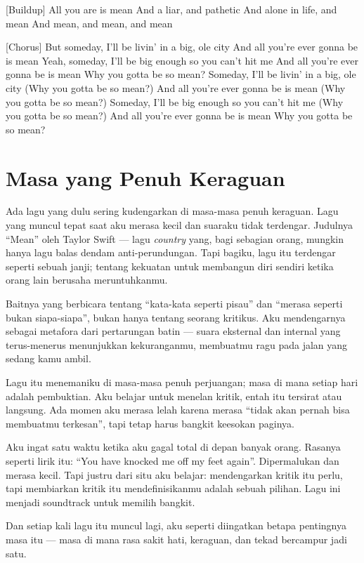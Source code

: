 \documentclass[
  letterpaper,
  DIV=11,
  numbers=noendperiod]{scrreprt}
\begin{document}
{[}Buildup{]} All you are is mean And a liar, and pathetic And alone in
life, and mean And mean, and mean, and mean

{[}Chorus{]} But someday, I'll be livin' in a big, ole city And all
you're ever gonna be is mean Yeah, someday, I'll be big enough so you
can't hit me And all you're ever gonna be is mean Why you gotta be so
mean? Someday, I'll be livin' in a big, ole city (Why you gotta be so
mean?) And all you're ever gonna be is mean (Why you gotta be so mean?)
Someday, I'll be big enough so you can't hit me (Why you gotta be so
mean?) And all you're ever gonna be is mean Why you gotta be so mean?

\section{Masa yang Penuh Keraguan}\label{masa-yang-penuh-keraguan}

Ada lagu yang dulu sering kudengarkan di masa-masa penuh keraguan. Lagu
yang muncul tepat saat aku merasa kecil dan suaraku tidak terdengar.
Judulnya ``Mean'' oleh Taylor Swift --- lagu \emph{country} yang, bagi
sebagian orang, mungkin hanya lagu balas dendam anti-perundungan. Tapi
bagiku, lagu itu terdengar seperti sebuah janji; tentang kekuatan untuk
membangun diri sendiri ketika orang lain berusaha meruntuhkanmu.

Baitnya yang berbicara tentang ``kata-kata seperti pisau'' dan ``merasa
seperti bukan siapa-siapa'', bukan hanya tentang seorang kritikus. Aku
mendengarnya sebagai metafora dari pertarungan batin --- suara eksternal
dan internal yang terus-menerus menunjukkan kekuranganmu, membuatmu ragu
pada jalan yang sedang kamu ambil.

Lagu itu menemaniku di masa-masa penuh perjuangan; masa di mana setiap
hari adalah pembuktian. Aku belajar untuk menelan kritik, entah itu
tersirat atau langsung. Ada momen aku merasa lelah karena merasa ``tidak
akan pernah bisa membuatmu terkesan'', tapi tetap harus bangkit keesokan
paginya.

Aku ingat satu waktu ketika aku gagal total di depan banyak orang.
Rasanya seperti lirik itu: ``You have knocked me off my feet again''.
Dipermalukan dan merasa kecil. Tapi justru dari situ aku belajar:
mendengarkan kritik itu perlu, tapi membiarkan kritik itu
mendefinisikanmu adalah sebuah pilihan. Lagu ini menjadi soundtrack
untuk memilih bangkit.

Dan setiap kali lagu itu muncul lagi, aku seperti diingatkan betapa
pentingnya masa itu --- masa di mana rasa sakit hati, keraguan, dan
tekad bercampur jadi satu.
\end{document}
